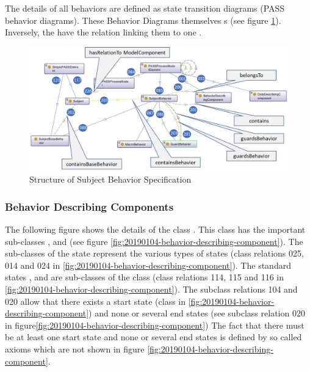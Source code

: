 The details of all behaviors are defined as state transition diagrams (PASS behavior diagrams). These Behavior Diagrams themselves   s (see figure \ref{fig:20190104-simple-elements-and-modellelement}). Inversely, the  have the relation  linking them to one  .

\begin{figure}[htbp]
	\centering
	\includegraphics[width=0.9\linewidth]{Figures/Ontology/SubjectBehavior/20190104-SImple-Elements-and-Modellelement}
	\caption[Structure of Subject Behavior Specification]{Structure of Subject Behavior Specification}
	\label{fig:20190104-simple-elements-and-modellelement}
\end{figure}

\subsubsection{Behavior Describing Components}

The following figure shows the details of the class . This class has the important sub-classes ,  and  (see figure \ref{fig:20190104-behavior-describing-component}). The sub-classes of the state represent the various types of states (class relations 025, 014 and 024 in \ref{fig:20190104-behavior-describing-component}). The standard states ,  and  are sub-classes of the class  (class relations 114, 115 and 116 in \ref{fig:20190104-behavior-describing-component}). The subclass relations 104 and 020 allow that there exists a start state (class  in \ref{fig:20190104-behavior-describing-component}) and none or several end states (see subclass relation 020 in figure\ref{fig:20190104-behavior-describing-component}) The fact that there must be at least one start state and none or several end states is defined by so called axioms which are not shown in figure \ref{fig:20190104-behavior-describing-component}.

